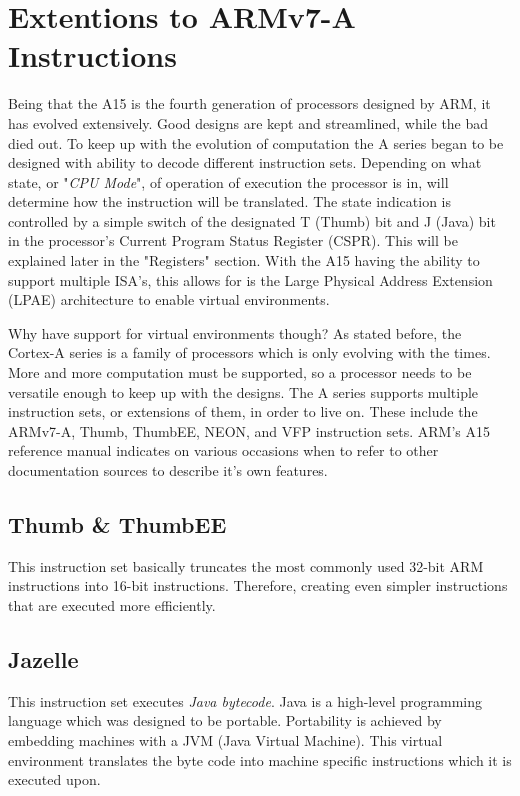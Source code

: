 \documentclass[12pt]{scrreprt}
\begin{document}
	\section{Extentions to ARMv7-A Instructions}

	Being that the A15 is the fourth generation of processors designed by ARM, it has evolved extensively.
	Good designs are kept and streamlined, while the bad died out.
	To keep up with the evolution of computation the A series began to be designed with ability to decode different instruction sets. 
	Depending on what state, or "\textit{CPU Mode}", of operation of execution the processor is in, will determine how the instruction will be translated.
	The state indication is controlled by a simple switch of the designated T (Thumb) bit and J (Java) bit in the processor's Current Program Status Register (CSPR).
	This will be explained later in the "Registers" section.
	With the A15 having the ability to support multiple ISA's, this allows for is the Large Physical Address Extension (LPAE) architecture to enable virtual environments.

	Why have support for virtual environments though? 
	As stated before, the Cortex-A series is a family of processors which is only evolving with the times.
	More and more computation must be supported, so a processor needs to be versatile enough to keep up with the designs.
	The A series supports multiple instruction sets, or extensions of them, in order to live on.
	These include the ARMv7-A, Thumb, ThumbEE, NEON, and VFP instruction sets. 
	ARM's A15 reference manual indicates on various occasions when to refer to other documentation sources to describe it's own features.

		\subsection{Thumb \& ThumbEE}
			This instruction set basically truncates the most commonly used 32-bit ARM instructions into 16-bit instructions.
			Therefore, creating even simpler instructions that are executed more efficiently.

		\subsection{Jazelle}
			This instruction set executes \textit{Java bytecode}.
			Java is a high-level programming language which was designed to be portable.
			Portability is achieved by embedding machines with a JVM (Java Virtual Machine).
			This virtual environment translates the byte code into machine specific instructions which it is executed upon.
			
\end{document}
